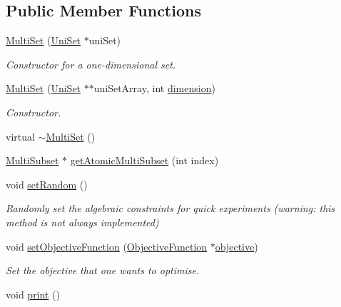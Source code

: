 \subsection*{Public Member Functions}
\begin{DoxyCompactItemize}
\item 
\hyperlink{classMultiSet_aa6ec2e2e6ef524acde12c795629f08c8}{Multi\-Set} (\hyperlink{classUniSet}{Uni\-Set} $\ast$uni\-Set)
\begin{DoxyCompactList}\small\item\em Constructor for a one-\/dimensional set. \end{DoxyCompactList}\item 
\hyperlink{classMultiSet_abafc2f4fb50484d3aabdd744dc1d6cc5}{Multi\-Set} (\hyperlink{classUniSet}{Uni\-Set} $\ast$$\ast$uni\-Set\-Array, int \hyperlink{classMultiSet_a1a49a7a8c3d0db003198312c3bd541af}{dimension})
\begin{DoxyCompactList}\small\item\em Constructor. \end{DoxyCompactList}\item 
virtual \hyperlink{classMultiSet_a3ad638b1613083b97a53ea58e9060a4d}{$\sim$\-Multi\-Set} ()
\item 
\hyperlink{classMultiSubset}{Multi\-Subset} $\ast$ \hyperlink{classMultiSet_a48a6504163110d377db974d6ea5bd8fe}{get\-Atomic\-Multi\-Subset} (int index)
\item 
\hypertarget{classMultiSet_aac2d5ee0afa30a8f565f29204a677cd9}{void \hyperlink{classMultiSet_aac2d5ee0afa30a8f565f29204a677cd9}{set\-Random} ()}\label{classMultiSet_aac2d5ee0afa30a8f565f29204a677cd9}

\begin{DoxyCompactList}\small\item\em Randomly set the algebraic constraints for quick experiments (warning\-: this method is not always implemented) \end{DoxyCompactList}\item 
void \hyperlink{classMultiSet_a0c7e6fb6d2eb064cf6bf2fe7e810726a}{set\-Objective\-Function} (\hyperlink{classObjectiveFunction}{Objective\-Function} $\ast$\hyperlink{classAbstractSet_a0217447a042827703e1ea7655f0fc099}{objective})
\begin{DoxyCompactList}\small\item\em Set the objective that one wants to optimise. \end{DoxyCompactList}\item 
\hypertarget{classMultiSet_ab08f0a90d249cecc0f7931caa2632f48}{void \hyperlink{classMultiSet_ab08f0a90d249cecc0f7931caa2632f48}{print} ()}\label{classMultiSet_ab08f0a90d249cecc0f7931caa2632f48}


\end{DoxyCompactItemize}

